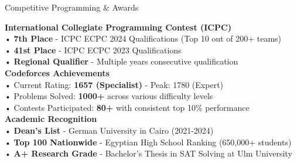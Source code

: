 \documentclass{resume}
\begin{document}

\begin{rSection}{Competitive Programming \& Awards}

{\bf International Collegiate Programming Contest (ICPC)} \\
• {\bf 7th Place} - ICPC ECPC 2024 Qualifications (Top 10 out of 200+ teams) \\
• {\bf 41st Place} - ICPC ECPC 2023 Qualifications \\
• {\bf Regional Qualifier} - Multiple years consecutive qualification \\

{\bf Codeforces Achievements} \\
• Current Rating: {\bf 1657 (Specialist)} - Peak: 1780 (Expert) \\
• Problems Solved: {\bf 1000+} across various difficulty levels \\
• Contests Participated: {\bf 80+} with consistent top 10\% performance \\

{\bf Academic Recognition} \\
• {\bf Dean's List} - German University in Cairo (2021-2024) \\
• {\bf Top 100 Nationwide} - Egyptian High School Ranking (650,000+ students) \\
• {\bf A+ Research Grade} - Bachelor's Thesis in SAT Solving at Ulm University \\

\end{rSection}

\end{document}
